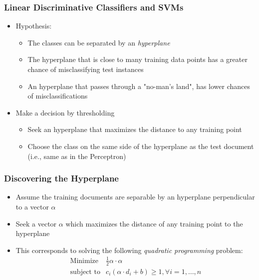 \documentclass{beamer}
\begin{document}
\begin{frame} \frametitle{Linear Discriminative Classifiers and SVMs}
  
  \begin{itemize}
  \item Hypothesis:
    \begin{itemize}
    \item The classes can be separated by an \emph{hyperplane}
    \item The hyperplane that is close to many training data points has a greater chance of misclassifying test instances
    \item An hyperplane that passes through a "no-man's land", has lower chances of misclassifications
    \end{itemize}
  \item Make a decision by thresholding
    \begin{itemize}
    \item Seek an hyperplane that maximizes the distance to any training point
    \item Choose the class on the same side of the hyperplane as the test
      document (i.e., same as in the Perceptron)
    \end{itemize}
  \end{itemize}

\end{frame}


\begin{frame} \frametitle{Discovering the Hyperplane}
  
  \begin{itemize}
  \item Assume the training documents are separable by an hyperplane
    perpendicular to a vector $\alpha$
  \item Seek a vector $\alpha$ which maximizes the distance of any training point to
    the hyperplane
  \item This corresponds to solving the following \emph{quadratic programming} problem:
    \begin{displaymath}
      \begin{array}{rl}
        \text{Minimize} & \frac{1}{2}\alpha\cdot\alpha \\
        \text{subject to} & c_i(\alpha\cdot d_i + b) \geq 1, \forall i = 1,
        \dotsc, n
      \end{array}
    \end{displaymath}
  \end{itemize}

\end{frame}
\end{document}
